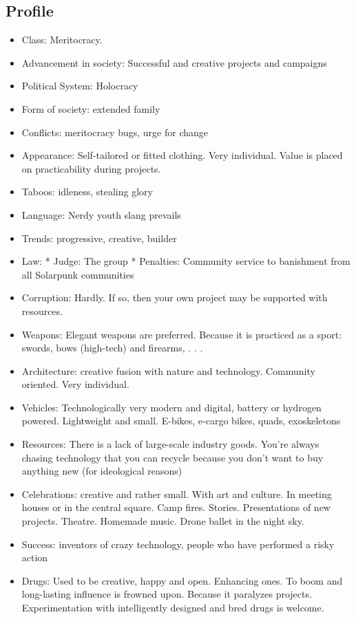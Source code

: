 \subsection{Profile}
\begin{itemize}
    \item Class: Meritocracy.
    \item Advancement in society: Successful and creative projects and campaigns
    \item Political System: Holocracy
    \item Form of society: extended family
    \item Conflicts: meritocracy bugs, urge for change
    \item Appearance: Self-tailored or fitted clothing. Very individual. Value is placed on practicability during projects.
    \item Taboos: idleness, stealing glory
    \item Language: Nerdy youth slang prevails
    \item Trends: progressive, creative, builder
    \item Law: * Judge: The group * Penalties: Community service to banishment from all Solarpunk communities
    \item Corruption: Hardly. If so, then your own project may be supported with resources.
    \item Weapons: Elegant weapons are preferred. Because it is practiced as a sport: swords, bows (high-tech) and firearms, . . .
    \item Architecture: creative fusion with nature and technology. Community oriented. Very individual.
    \item Vehicles: Technologically very modern and digital, battery or hydrogen powered. Lightweight and small. E-bikes, e-cargo bikes, quads, exoskeletons
    \item Resources: There is a lack of large-scale industry goods. You're always chasing technology that you can recycle because you don't want to buy anything new (for ideological reasons)
    \item Celebrations: creative and rather small. With art and culture. In meeting houses or in the central square. Camp fires. Stories. Presentations of new projects. Theatre. Homemade music. Drone ballet in the night sky.
    \item Success: inventors of crazy technology, people who have performed a risky action
    \item Drugs: Used to be creative, happy and open. Enhancing ones. To boom and long-lasting influence is frowned upon. Because it paralyzes projects. Experimentation with intelligently designed and bred drugs is welcome.

\end{itemize}
